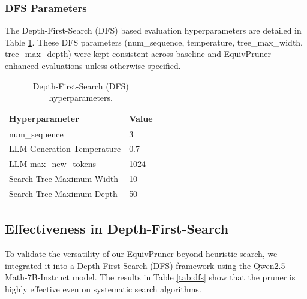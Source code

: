 \documentclass[11pt]{article}
\begin{document}
\subsubsection{DFS Parameters}
\label{subapp:DFS_Parameters}
The Depth-First-Search (DFS) based evaluation hyperparameters are detailed in Table \ref{tab:dfs_hyperparams}.
These DFS parameters (num\_sequence, temperature, tree\_max\_width, tree\_max\_depth) were kept consistent across baseline and EquivPruner-enhanced evaluations unless otherwise specified.
\begin{table}[ht]
\centering
\caption{Depth-First-Search (DFS) hyperparameters.}
\label{tab:dfs_hyperparams}
\begin{tabular}{ll}
\hline
\textbf{Hyperparameter}                                 & \textbf{Value} \\ \hline
num\_sequence                                   & 3             \\
LLM Generation Temperature                              & 0.7            \\
LLM max\_new\_tokens         & 1024           \\
Search Tree Maximum Width                               & 10             \\
Search Tree Maximum Depth                               & 50             \\ \hline
\end{tabular}
\end{table}
\subsection{Effectiveness in Depth-First-Search}
\label{dfsapp}
To validate the versatility of our EquivPruner beyond heuristic search, we integrated it into a Depth-First Search (DFS) framework using the Qwen2.5-Math-7B-Instruct model. The results in Table \ref{tab:dfs} show that the pruner is highly effective even on systematic search algorithms.
\end{document}
